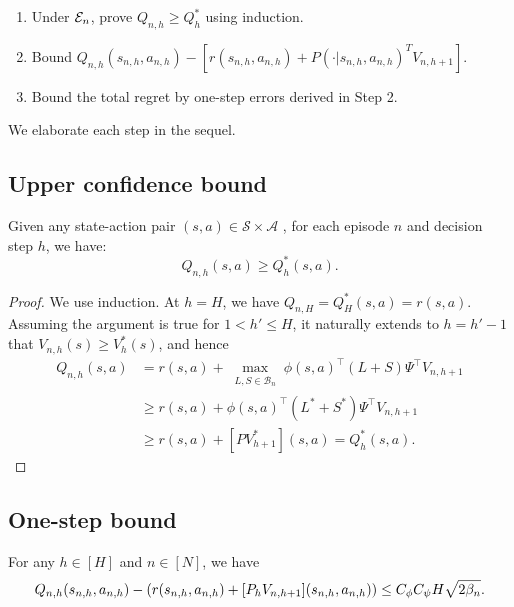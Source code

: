 \begin{enumerate}
\item Under ${\cal E}_n$, prove $Q_{n,h}\ge Q_h^*$ using induction. 

\item Bound $Q_{n,h}(s_{n,h},a_{n,h})-[r(s_{n,h},a_{n,h})+P(\cdot|s_{n,h},a_{n,h})^TV_{n,h+1}]$.

\item Bound the total regret by one-step errors derived in Step 2.
\end{enumerate}
We elaborate each step in the sequel.
\subsection{Upper confidence bound}
\begin{lemma}\label{lem:optimism}
Given any state-action pair $(s, a) \in \mathcal{S} \times \mathcal{A}$ , for each episode $n$ and decision step $h$, we have:
$$Q_{n,h}(s, a) \geq Q_h^*(s, a).$$
\end{lemma}
\begin{proof}
We use induction.
At $h=H$, we have $Q_{n,H}=Q_H^*(s, a)=r(s,a)$. Assuming the argument is true for $1<h'\le H$, it naturally extends to $h=h'-1$ that $V_{n,h}(s)\ge V_h^*(s)$, and hence 
\begin{align*}
     Q_{n, h}(s, a) 
     &= r(s, a) + \max_{\substack{ L, S \in \mathcal{B}_n}}\phi(s, a)^{\top} ( L+ S)  \Psi^{\top} V_{n, h+1}\\
     &\geq r(s, a) + \phi(s, a)^{\top} ( L^*+ S^*)  \Psi^{\top} V_{n, h+1}\\
     &\geq r(s, a) + [P V^*_{h+1}](s, a)=Q_h^*(s, a).
\end{align*}
\end{proof} 
\subsection{One-step bound}
\begin{lemma}\label{lem:boundQ} 
     For any $h \in [H]$ and $n \in [N]$, we have 
     \[Q_{n,h}(s_{n,h},a_{n,h})-\left( r(s_{n,h},a_{n,h})+[P_h V_{n,h+1}](s_{n,h},a_{n,h}) \right)
     \leq C_{\phi}C_{\psi}H\sqrt{2\beta_n}.\]
     \end{lemma}

